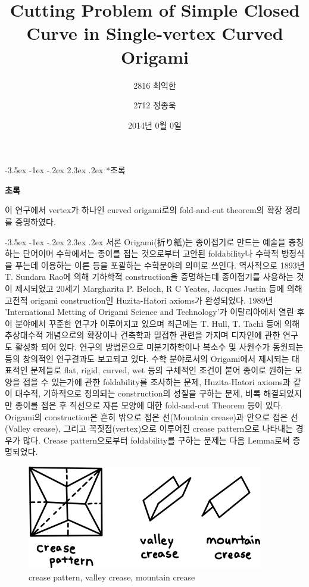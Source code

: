 \documentclass[11pt]{article}
\title{Cutting Problem of Simple Closed Curve in Single-vertex Curved Origami}
\date{2014년 0월 0일}
\author{2816 최익한 \and 2712 정종욱}
\makeatletter
\renewcommand{\abstractname}{초록}
\renewcommand\section{\@startsection {section}{1}{\z@}%
                                   {-3.5ex \@plus -1ex \@minus -.2ex}%
                                   {2.3ex \@plus.2ex}%
                                   {\normalfont\large\sffamily\bfseries}}
\renewenvironment{abstract}{%
      \if@twocolumn
        \section*{\abstractname}%
      \else
        \begin{center}%
          {\large\sffamily\bfseries 초록\vspace{-.0em}\vspace{\z@}}%
        \end{center}%
        \quotation
      \fi}
      {\if@twocolumn\else\endquotation\fi}
\def\advisor#1{\gdef\@advisor{#1}}
\def\@advisor{\@latex@warning@no@line{No \noexpand\advisor given}}
\def\school#1{\gdef\@school{#1}}
\def\@school{\@latex@warning@no@line{No \noexpand\school given}}
\renewcommand\maketitle{\begin{titlepage}%
  \let\footnotesize\small
  \let\footnoterule\relax
  \let \footnote \thanks
  \null\vfil
  \vskip 60\p@
  \begin{center}%
    {\LARGE \@title \par}%
    \vskip 3em%
    {\large
     \lineskip .75em%
      \begin{tabular}[t]{c}%
        \@author
      \end{tabular}\par}%
      \vskip 1.5em%
    {\large \begin{tabular}[t]{c}\@date \end{tabular}\par}%
      \vskip 1.5em%
{\large
     \lineskip .75em%
      \begin{tabular}[t]{c}%
\@school   \and         \@advisor
      \end{tabular}\par}

  \end{center}\par
  \@thanks
  \vfil\null
  \end{titlepage}%
  \setcounter{footnote}{0}%
  \global\let\thanks\relax
  \global\let\maketitle\relax
  \global\let\@thanks\@empty
  \global\let\@author\@empty
  \global\let\@date\@empty
  \global\let\title\relax
  \global\let\author\relax
  \global\let\date\relax
  \global\let\and\relax
  \global\let\@advisor\@empty
  \global\let\advisor\relax
}
\makeatother
\begin{document}
\thispagestyle{empty}
\maketitle





\begin{center}\huge\bfseries
\makeatletter\@title\makeatother
\end{center}
\vspace*{50mm}
\begin{abstract}\noindent
이 연구에서 vertex가 하나인 curved origami로의 fold-and-cut theorem의 확장 정리를 증명하였다.
\end{abstract}


\bigskip
\section{서론} 
Origami(折り紙)는 종이접기로 만드는 예술을 총칭하는 단어이며 수학에서는 종이를 접는 것으로부터 고안된 foldability나 수학적 방정식을 푸는데 이용하는 이론 등을 포괄하는 수학분야의 의미로 쓰인다. 역사적으로 1893년 T. Sundara Rao에 의해 기하학적 construction을 증명하는데 종이접기를 사용하는 것이 제시되었고 20세기 Margharita P. Beloch, R C Yeates, Jacques Justin 등에 의해 고전적 origami construction인 Huzita-Hatori axioms가 완성되었다. 1989년 'International Metting of Origami Science and Technology'가 이탈리아에서 열린 후 이 분야에서 꾸준한 연구가 이루어지고 있으며 최근에는 T. Hull, T. Tachi 등에 의해 추상대수적 개념으로의 확장이나 건축학과 밀접한 관련을 가지며 디자인에 관한 연구도 활성화 되어 있다. \cite{4,5,7,8} 연구의 방법론으로 미분기하학이나 복소수 및 사원수가 동원되는 등의 창의적인 연구결과도 보고되고 있다. \cite{2,3,9}
수학 분야로서의 Origami에서 제시되는 대표적인 문제들로 flat, rigid, curved, wet 등의 구체적인 조건이 붙어 종이로 원하는 모양을 접을 수 있는가에 관한 foldability를 조사하는 문제, Huzita-Hatori axioms과 같이 대수적, 기하적으로 정의되는 construction의 성질을 구하는 문제, 비록 해결되었지만 종이를 접은 후 직선으로 자른 모양에 대한 fold-and-cut Theorem 등이 있다.
Origami의 construction은 흔히 밖으로 접은 선(Mountain crease)과 안으로 접은 선 (Valley crease), 그리고 꼭짓점(vertex)으로 이루어진 crease pattern으로 나타내는 경우가 많다. Crease pattern으로부터 foldability를 구하는 문제는 다음 Lemma로써 증명되었다.


\begin{figure}
\centering
\includegraphics{1.png}
\caption{crease pattern, valley crease, mountain crease}
\end{figure}
\end{document}
